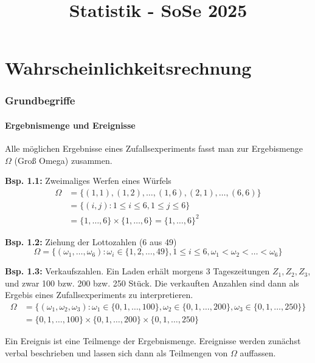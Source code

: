 \documentclass[a4paper,11pt]{article}
\begin{document}
\title{\Huge{\textbf{Statistik - SoSe 2025}}}
\author{}
\date{}
\maketitle
\tableofcontents

\part{Wahrscheinlichkeitsrechnung}

\section{Grundbegriffe}

\subsection{Ergebnismenge und Ereignisse}
Alle möglichen Ergebnisse eines Zufallsexperiments fasst man zur Ergebismenge $\Omega$ (Groß Omega) zusammen.

\vspace{6pt}
\noindent\textbf{Bsp. 1.1:} Zweimaliges Werfen eines Würfels
\begin{align*} 
    \Omega &= \{(1,1),(1,2),\dots,(1,6),(2,1),\dots,(6,6)\} \\
        &= \{(i,j): 1\leq i\leq 6,1\leq j\leq 6\}\\
        &=\{1,\dots,6\}\times\{1,\dots,6\}=\{1,\dots,6\}^2
\end{align*}

\vspace{6pt}
\noindent\textbf{Bsp. 1.2:} Ziehung der Lottozahlen (6 aus 49)
\[\Omega = \{(\omega_1,\dots,\omega_6):\omega_i \in \{1,2,\dots,49\}, 1\leq i\leq6, \omega_1 < \omega_2 <\dots<\omega_6\}\]

\vspace{6pt}
\noindent\textbf{Bsp. 1.3:} Verkaufszahlen. Ein Laden erhält morgens 3 Tageszeitungen $Z_1,Z_2,Z_3$, und zwar 100 bzw. 200 bzw. 250 Stück. Die verkauften Anzahlen sind dann als Ergebis eines Zufallsexperiments zu interpretieren.
\begin{align*}
    \Omega &= \{(\omega_1,\omega_2,\omega_3): \omega_1 \in \{0,1,\dots,100\}, \omega_2 \in \{0,1,\dots,200\}, \omega_3 \in \{0,1,\dots,250\}\} \\
    &= \{0,1,\dots,100\}\times\{0,1,\dots,200\}\times\{0,1,\dots,250\}
\end{align*}

\vspace{6pt}
\noindent Ein Ereignis ist eine Teilmenge der Ergebnismenge. Ereignisse werden zunächst verbal beschrieben 
und lassen sich dann als Teilmengen von $\Omega$ auffassen.
\end{document}
